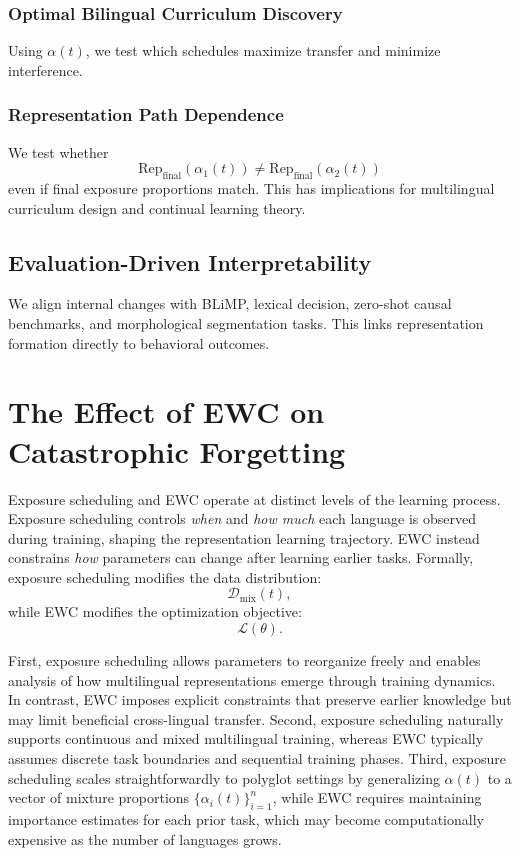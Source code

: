 \subsubsection{Optimal Bilingual Curriculum Discovery}

Using $\alpha(t)$, we test which schedules maximize transfer and minimize interference.

\subsubsection{Representation Path Dependence}

We test whether
\begin{equation}
\text{Rep}_{\text{final}}(\alpha_1(t)) \neq \text{Rep}_{\text{final}}(\alpha_2(t))
\end{equation}
even if final exposure proportions match.  
This has implications for multilingual curriculum design and continual learning theory.

\subsection{Evaluation-Driven Interpretability}

We align internal changes with BLiMP, lexical decision, zero-shot causal benchmarks, and morphological segmentation tasks.  
This links representation formation directly to behavioral outcomes.


\section{The Effect of EWC on Catastrophic Forgetting}


Exposure scheduling and EWC operate at distinct levels of the learning process. Exposure scheduling controls \emph{when} and \emph{how much} each language is observed during training, shaping the representation learning trajectory. EWC instead constrains \emph{how} parameters can change after learning earlier tasks. Formally, exposure scheduling modifies the data distribution:
\[
\mathcal{D}_{\text{mix}}(t),
\]
while EWC modifies the optimization objective:
\[
\mathcal{L}(\theta).
\]

First, exposure scheduling allows parameters to reorganize freely and enables analysis of how multilingual representations emerge through training dynamics. In contrast, EWC imposes explicit constraints that preserve earlier knowledge but may limit beneficial cross-lingual transfer. Second, exposure scheduling naturally supports continuous and mixed multilingual training, whereas EWC typically assumes discrete task boundaries and sequential training phases. Third, exposure scheduling scales straightforwardly to polyglot settings by generalizing $\alpha(t)$ to a vector of mixture proportions $\{\alpha_i(t)\}_{i=1}^n$, while EWC requires maintaining importance estimates for each prior task, which may become computationally expensive as the number of languages grows.

